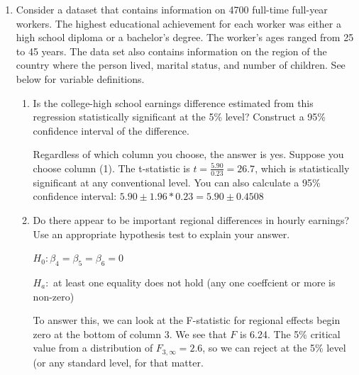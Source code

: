 \documentclass[
]{article}
\providecommand{\tightlist}{%
  \setlength{\itemsep}{0pt}\setlength{\parskip}{0pt}}
\begin{document}
\begin{enumerate}
\item
  Consider a dataset that contains information on 4700 full-time
  full-year workers. The highest educational achievement for each worker
  was either a high school diploma or a bachelor's degree. The worker's
  ages ranged from 25 to 45 years. The data set also contains
  information on the region of the country where the person lived,
  marital status, and number of children. See below for variable
  definitions.

  \begin{enumerate}
  \def\labelenumii{\alph{enumii}.}
  \tightlist
  \item
    Is the college-high school earnings difference estimated from this
    regression statistically significant at the 5\% level? Construct a
    95\% confidence interval of the difference.
    
{    \color{red} Regardless of which column you choose, the answer is yes. Suppose you choose column (1). The t-statistic is $t = \frac{5.90}{0.23} = 26.7$, which is statistically significant at any conventional level. You can also calculate a 95\% confidence interval: $5.90 \pm 1.96*0.23 = 5.90 \pm 0.4508$}
    

  \item
    Do there appear to be important regional differences in hourly
    earnings? Use an appropriate hypothesis test to explain your
    answer.
    
    {\color{red} 
    $H_0: \beta_4 = \beta_5 = \beta_6 = 0$
    
    $H_a:$ at least one equality does not hold (any one coeffcient or more is non-zero)
    
    To answer this, we can look at the F-statistic for regional effects begin zero at the bottom of column 3. We see that $F$ is 6.24. The 5\% critical value from a distribution of $F_{3,\infty} = 2.6$, so we can reject at the 5\% level (or any standard level, for that matter.} 
  \end{enumerate}
\end{enumerate}
\end{document}
